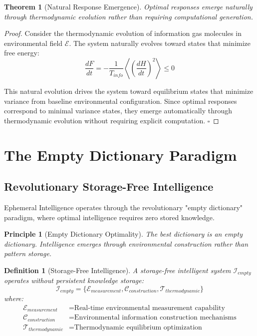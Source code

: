 \documentclass[12pt,a4paper]{article}
\newtheorem{theorem}{Theorem}
\newtheorem{definition}{Definition}
\newtheorem{principle}{Principle}
\begin{document}
\begin{theorem}[Natural Response Emergence]
Optimal responses emerge naturally through thermodynamic evolution rather than requiring computational generation.
\end{theorem}

\begin{proof}
Consider the thermodynamic evolution of information gas molecules in environmental field $\mathcal{E}$. The system naturally evolves toward states that minimize free energy:
\begin{equation}
\frac{dF}{dt} = -\frac{1}{T_{info}} \left\langle \left(\frac{dH}{dt}\right)^2 \right\rangle \leq 0
\end{equation}

This natural evolution drives the system toward equilibrium states that minimize variance from baseline environmental configuration. Since optimal responses correspond to minimal variance states, they emerge automatically through thermodynamic evolution without requiring explicit computation. $\square$
\end{proof}

\section{The Empty Dictionary Paradigm}

\subsection{Revolutionary Storage-Free Intelligence}

Ephemeral Intelligence operates through the revolutionary "empty dictionary" paradigm, where optimal intelligence requires zero stored knowledge.

\begin{principle}[Empty Dictionary Optimality]
The best dictionary is an empty dictionary. Intelligence emerges through environmental construction rather than pattern storage.
\end{principle}

\begin{definition}[Storage-Free Intelligence]
A storage-free intelligent system $\mathcal{I}_{empty}$ operates without persistent knowledge storage:
\begin{equation}
\mathcal{I}_{empty} = \{\mathcal{E}_{measurement}, \mathcal{C}_{construction}, \mathcal{T}_{thermodynamic}\}
\end{equation}
where:
\begin{align}
\mathcal{E}_{measurement} &= \text{Real-time environmental measurement capability} \\
\mathcal{C}_{construction} &= \text{Environmental information construction mechanisms} \\
\mathcal{T}_{thermodynamic} &= \text{Thermodynamic equilibrium optimization}
\end{align}
\end{definition}
\end{document}
